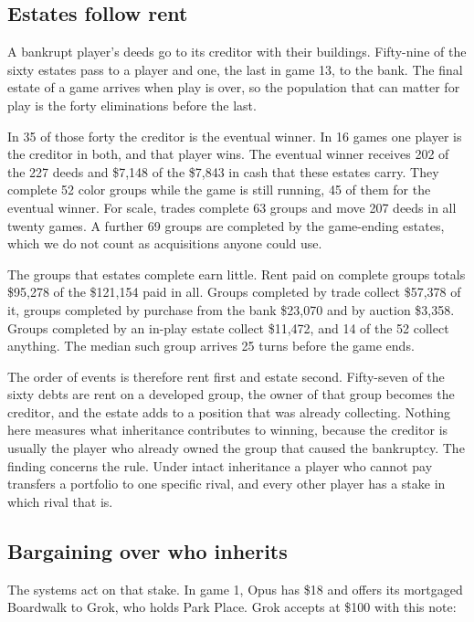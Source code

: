 \subsection{Estates follow rent}

A bankrupt player's deeds go to its creditor with their buildings. Fifty-nine of the sixty estates pass to a player and one, the last in game 13, to the bank. The final estate of a game arrives when play is over, so the population that can matter for play is the forty eliminations before the last.

In 35 of those forty the creditor is the eventual winner. In 16 games one player is the creditor in both, and that player wins. The eventual winner receives 202 of the 227 deeds and \$7,148 of the \$7,843 in cash that these estates carry. They complete 52 color groups while the game is still running, 45 of them for the eventual winner. For scale, trades complete 63 groups and move 207 deeds in all twenty games. A further 69 groups are completed by the game-ending estates, which we do not count as acquisitions anyone could use.

The groups that estates complete earn little. Rent paid on complete groups totals \$95,278 of the \$121,154 paid in all. Groups completed by trade collect \$57,378 of it, groups completed by purchase from the bank \$23,070 and by auction \$3,358. Groups completed by an in-play estate collect \$11,472, and 14 of the 52 collect anything. The median such group arrives 25 turns before the game ends.

The order of events is therefore rent first and estate second. Fifty-seven of the sixty debts are rent on a developed group, the owner of that group becomes the creditor, and the estate adds to a position that was already collecting. Nothing here measures what inheritance contributes to winning, because the creditor is usually the player who already owned the group that caused the bankruptcy. The finding concerns the rule. Under intact inheritance a player who cannot pay transfers a portfolio to one specific rival, and every other player has a stake in which rival that is.

\subsection{Bargaining over who inherits}

The systems act on that stake. In game 1, Opus has \$18 and offers its mortgaged Boardwalk to Grok, who holds Park Place. Grok accepts at \$100 with this note:

